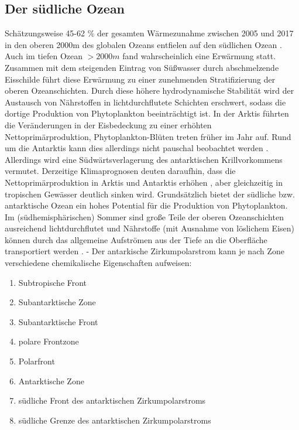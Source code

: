 \documentclass[12pt,a4paper,onecolumn]{scrartcl}
\begin{document}
\subsection{Der südliche Ozean}
Schätzungsweise 45-62 \% der gesamten Wärmezunahme zwischen 2005 und 2017 in den oberen 2000m des globalen Ozeans entfielen auf den südlichen Ozean \citep{IPCCpol.2019}. Auch im tiefen Ozean $>2000m$ fand wahrscheinlich eine Erwärmung statt. Zusammen mit dem steigenden Eintrag von Süßwasser durch abschmelzende Eisschilde führt diese Erwärmung zu  einer zunehmenden Stratifizierung der oberen Ozeanschichten. Durch diese höhere hydrodynamische Stabilität wird  der Austausch von Nährstoffen in lichtdurchflutete Schichten erschwert, sodass die dortige Produktion von Phytoplankton beeinträchtigt ist. In der Arktis führten die Veränderungen in der Eisbedeckung zu einer erhöhten Nettoprimärproduktion, Phytoplankton-Blüten treten früher im Jahr auf. Rund um die Antarktis kann dies allerdings nicht pauschal beobachtet werden \citep{IPCCpol.2019}. Allerdings wird eine Südwärtsverlagerung des antarktischen Krillvorkommens vermutet. Derzeitige Klimaprognosen deuten daraufhin, dass die Nettoprimärproduktion in Arktis und Antarktis erhöhen , aber gleichzeitig in tropischen Gewässer deutlich sinken wird. Grundsätzlich bietet der südliche bzw. antarktische Ozean ein hohes Potential für die Produktion von Phytoplankton. Im (südhemisphärischen) Sommer sind große Teile der oberen Ozeanschichten ausreichend lichtdurchflutet und Nährstoffe (mit Ausnahme von löslichem Eisen) können durch das allgemeine Aufströmen aus der Tiefe an die Oberfläche transportiert werden \citep{Martin.1990}. -  Der antarkische Zirkumpolarstrom kann je nach Zone verschiedene chemikalische Eigenschaften aufweisen:

\begin{enumerate}
\item Subtropische Front
\item Subantarktische Zone
\item Subantarktische Front
\item polare Frontzone
\item Polarfront
\item Antarktische Zone
\item südliche Front des antarktischen Zirkumpolarstroms
\item südliche Grenze des antarktischen Zirkumpolarstroms
\end{enumerate}
\end{document}
